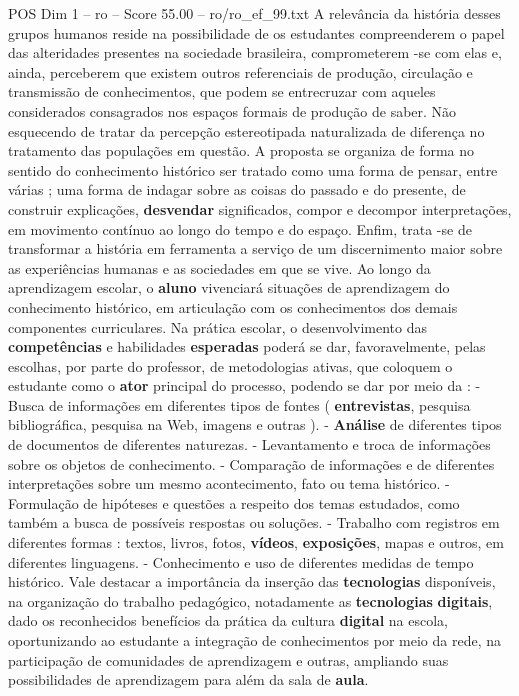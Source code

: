\begin{textsample}{POS Dim 1 – ro – Score 55.00 – ro/ro\_ef\_99.txt}
A relevância da história desses grupos humanos reside na possibilidade de os estudantes compreenderem o papel das alteridades presentes na sociedade brasileira, comprometerem -se com elas e, ainda, perceberem que existem outros referenciais de produção, circulação e transmissão de conhecimentos, que podem se entrecruzar com aqueles considerados consagrados nos espaços formais de produção de saber.
Não esquecendo de tratar da percepção estereotipada naturalizada de diferença no tratamento das populações em questão.
A proposta se organiza de forma no sentido do conhecimento histórico ser tratado como uma forma de pensar, entre várias ; uma forma de indagar sobre as coisas do passado e do presente, de construir explicações, \textbf{desvendar} significados, compor e decompor interpretações, em movimento contínuo ao longo do tempo e do espaço.
Enfim, trata -se de transformar a história em ferramenta a serviço de um discernimento maior sobre as experiências humanas e as sociedades em que se vive.
Ao longo da aprendizagem escolar, o \textbf{aluno} vivenciará situações de aprendizagem do conhecimento histórico, em articulação com os conhecimentos dos demais componentes curriculares.
Na prática escolar, o desenvolvimento das \textbf{competências} e habilidades \textbf{esperadas} poderá se dar, favoravelmente, pelas escolhas, por parte do professor, de metodologias ativas, que coloquem o estudante como o \textbf{ator} principal do processo, podendo se dar por meio da : - Busca de informações em diferentes tipos de fontes ( \textbf{entrevistas}, pesquisa bibliográfica, pesquisa na Web, imagens e outras ). - \textbf{Análise} de diferentes tipos de documentos de diferentes naturezas. - Levantamento e troca de informações sobre os objetos de conhecimento. - Comparação de informações e de diferentes interpretações sobre um mesmo acontecimento, fato ou tema histórico. - Formulação de hipóteses e questões a respeito dos temas estudados, como também a busca de possíveis respostas ou soluções. - Trabalho com registros em diferentes formas : textos, livros, fotos, \textbf{vídeos}, \textbf{exposições}, mapas e outros, em diferentes linguagens. - Conhecimento e uso de diferentes medidas de tempo histórico.
Vale destacar a importância da inserção das \textbf{tecnologias} disponíveis, na organização do trabalho pedagógico, notadamente as \textbf{tecnologias} \textbf{digitais}, dado os reconhecidos benefícios da prática da cultura \textbf{digital} na escola, oportunizando ao estudante a integração de conhecimentos por meio da rede, na participação de comunidades de aprendizagem e outras, ampliando suas possibilidades de aprendizagem para além da sala de \textbf{aula}.

\end{textsample}
